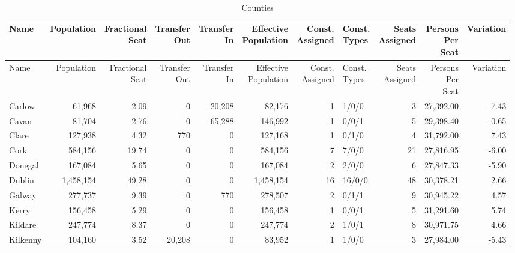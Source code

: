 \documentclass[a4paper]{article}
\begin{document}
\begin{longtable}{lrrrrrrlrrr}
\caption{Counties}
\\ \toprule
Name &Population &\shortstack{Fractional\\Seat} &\shortstack{Transfer\\Out} &\shortstack{Transfer\\In} &\shortstack{Effective\\Population} &\shortstack{Const.\\Assigned} &\shortstack{Const.\\Types} &\shortstack{Seats\\Assigned} &\shortstack{Persons\\Per\\Seat} &Variation \\ \midrule
\endfirsthead
\toprule
Name &Population &\shortstack{Fractional\\Seat} &\shortstack{Transfer\\Out} &\shortstack{Transfer\\In} &\shortstack{Effective\\Population} &\shortstack{Const.\\Assigned} &\shortstack{Const.\\Types} &\shortstack{Seats\\Assigned} &\shortstack{Persons\\Per\\Seat} &Variation \\ \midrule
\endhead
\bottomrule
\endfoot
Carlow&61,968& 2.09&0&20,208&82,176&1&1/0/0&3&27,392.00&-7.43\\ 
Cavan&81,704& 2.76&0&65,288&146,992&1&0/0/1&5&29,398.40&-0.65\\ 
Clare&127,938& 4.32&770&0&127,168&1&0/1/0&4&31,792.00& 7.43\\ 
Cork&584,156&19.74&0&0&584,156&7&7/0/0&21&27,816.95&-6.00\\ 
Donegal&167,084& 5.65&0&0&167,084&2&2/0/0&6&27,847.33&-5.90\\ 
Dublin&1,458,154&49.28&0&0&1,458,154&16&16/0/0&48&30,378.21& 2.66\\ 
Galway&277,737& 9.39&0&770&278,507&2&0/1/1&9&30,945.22& 4.57\\ 
Kerry&156,458& 5.29&0&0&156,458&1&0/0/1&5&31,291.60& 5.74\\ 
Kildare&247,774& 8.37&0&0&247,774&2&1/0/1&8&30,971.75& 4.66\\ 
Kilkenny&104,160& 3.52&20,208&0&83,952&1&1/0/0&3&27,984.00&-5.43\\ 

\end{longtable}
\end{document}
